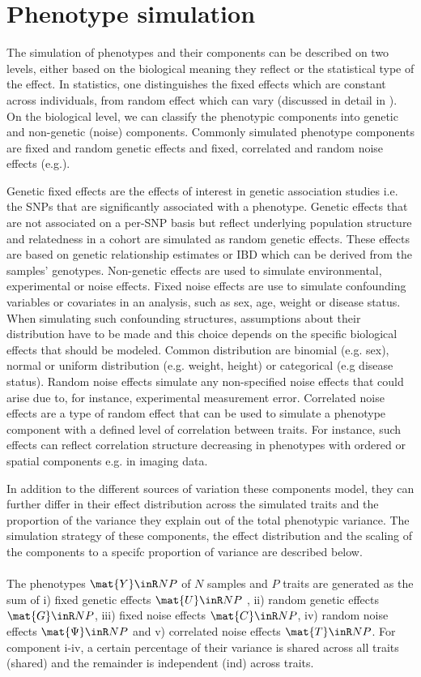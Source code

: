 \section{Phenotype simulation}
\label{section:phenotype-simulation}
The simulation of phenotypes and their components can be described on two levels, either based on the biological meaning they reflect or the statistical type of the effect. In statistics, one distinguishes the fixed effects which are constant across individuals, from random effect which can vary (discussed in detail in \citep{Gelman2005}). On the biological level, we can classify the phenotypic components into genetic and non-genetic (noise) components.
Commonly simulated phenotype components are fixed and random genetic effects and fixed, correlated and random noise effects (e.g.\citep{Stephens2013,Marigorta2014,Zhou2014,Loh2014}). 

Genetic fixed effects are the effects of interest in genetic association studies i.e. the SNPs that are significantly associated with a phenotype. Genetic effects that are not associated on a per-SNP basis but reflect underlying population structure and relatedness in a cohort are simulated as random genetic effects. These effects are based on genetic relationship estimates or IBD which can be derived from the samples' genotypes. Non-genetic effects are used to simulate environmental, experimental or noise effects. Fixed noise effects are use to simulate confounding variables or covariates in an analysis, such as sex, age, weight or disease status. When simulating such confounding structures, assumptions about their distribution have to be made and this choice depends on the specific biological effects that should be modeled. Common distribution are binomial (e.g. sex), normal or uniform distribution (e.g. weight, height) or categorical (e.g disease status). Random noise effects simulate any non-specified noise effects that could arise due to, for instance, experimental measurement error.  Correlated noise effects are a type of random effect that can be used to simulate a phenotype component with a defined level of correlation between traits. For instance, such effects can reflect correlation structure decreasing in phenotypes with ordered or spatial components e.g. in imaging data. 

In addition to the different sources of variation these components model, they can further differ in their effect distribution across the simulated traits and the proportion of the variance they explain out of the total phenotypic variance. The simulation strategy of these components, the effect distribution and the scaling of the components to a specifc proportion of variance are described below. 
\\
\\
The phenotypes \( \mat{Y} \inR N P\) of \(N\) samples and \(P\) traits are generated as the sum of i) fixed genetic effects \( \mat{U}  \inR N P\) , ii) random genetic effects \( \mat{G} \inR N P\), iii) fixed noise effects \( \mat{C} \inR N P\), iv) random noise effects \( \mat{\Psi} \inR N P\) and v) correlated noise effects \( \mat{T} \inR N P\). For component i-iv, a certain percentage of their variance is shared across all traits (shared) and the remainder is independent (ind) across traits.

